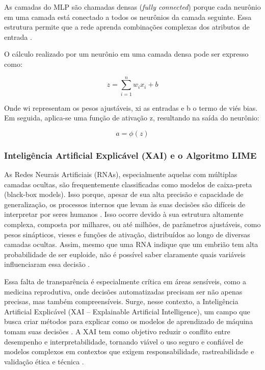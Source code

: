 As camadas do MLP são chamadas densas (\textit{fully connected}) porque cada neurônio em uma camada está conectado a todos os neurônios da camada seguinte. Essa estrutura permite que a rede aprenda combinações complexas dos atributos de entrada \cite{haykin2009}.

O cálculo realizado por um neurônio em uma camada densa pode ser expresso como:

\begin{equation}
    z = \sum_{i=1}^{n} w_i x_i + b
\end{equation}

Onde wi representam os pesos ajustáveis, xi as entradas e b o termo de viés bias. Em seguida, aplica-se uma função de ativação z, resultando na saída do neurônio:

\begin{equation}
    a = \phi(z)
\end{equation}

\subsubsection{Inteligência Artificial Explicável (XAI) e o Algoritmo LIME}

As Redes Neurais Artificiais (RNAs), especialmente aquelas com múltiplas camadas ocultas, são frequentemente classificadas como modelos de caixa-preta (black-box models). Isso porque, apesar de sua alta precisão e capacidade de generalização, os processos internos que levam às suas decisões são difíceis de interpretar por seres humanos \cite{adadi2018}. Isso ocorre devido à sua estrutura altamente complexa, composta por milhares, ou até milhões, de parâmetros ajustáveis, como pesos sinápticos, vieses e funções de ativação, distribuídos ao longo de diversas camadas ocultas. Assim, mesmo que uma RNA indique que um embrião tem alta probabilidade de ser euploide, não é possível saber claramente quais variáveis influenciaram essa decisão \cite{ribeiro2016}.

Essa falta de transparência é especialmente crítica em áreas sensíveis, como a medicina reprodutiva, onde decisões automatizadas precisam ser não apenas precisas, mas também compreensíveis. Surge, nesse contexto, a Inteligência Artificial Explicável (XAI – Explainable Artificial Intelligence), um campo que busca criar métodos para explicar como os modelos de aprendizado de máquina tomam suas decisões \cite{gilpin2018}. A XAI tem como objetivo reduzir o conflito entre desempenho e interpretabilidade, tornando viável o uso seguro e confiável de modelos complexos em contextos que exigem responsabilidade, rastreabilidade e validação ética e técnica \cite{gilpin2018}.

